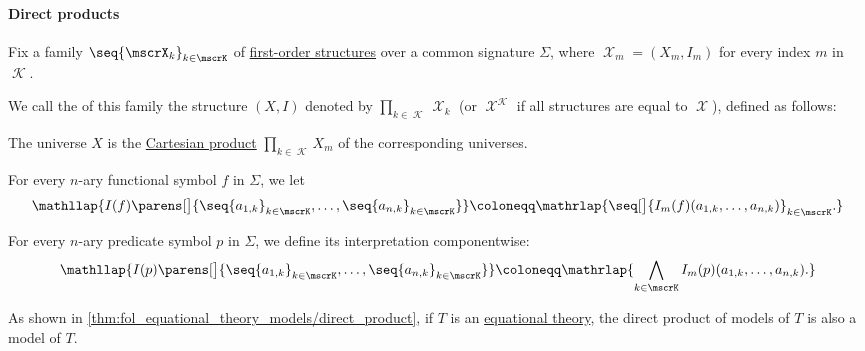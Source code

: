 \paragraph{Direct products}

\begin{definition}\label{def:fol_direct_product}
  Fix a family \( \seq{ \mscrX_k }_{k \in \mscrK} \) of \hyperref[def:fol_structure]{first-order structures} over a common signature \( \Sigma \), where \( \mscrX_m = (X_m, I_m) \) for every index \( m \) in \( \mscrK \).

  We call the  of this family the structure \( (X, I) \) denoted by \( \prod_{k \in \mscrK} \mscrX_k \) (or \( \mscrX^\mscrK \) if all structures are equal to \( \mscrX \)), defined as follows:
  \begin{thmenum}
     The universe \( X \) is the \hyperref[def:cartesian_product]{Cartesian product} \( \prod_{k \in \mscrK} X_m \) of the corresponding universes.

     For every \( n \)-ary functional symbol \( f \) in \( \Sigma \), we let
    \begin{equation*}
      \mathllap{I(f)\parens[\big]{ \seq{ a_{1,k} }_{k \in \mscrK}, \ldots, \seq{ a_{n,k} }_{k \in \mscrK} }} \coloneqq \mathrlap{\seq[\big]{ I_m(f)(a_{1,k}, \ldots, a_{n,k}) }_{k \in \mscrK}.}
    \end{equation*}

     For every \( n \)-ary predicate symbol \( p \) in \( \Sigma \), we define its interpretation componentwise:
    \begin{equation*}
      \mathllap{I(p)\parens[\big]{ \seq{ a_{1,k} }_{k \in \mscrK}, \ldots, \seq{ a_{n,k} }_{k \in \mscrK} }} \coloneqq \mathrlap{\bigwedge_{k \in \mscrK} I_m(p)(a_{1,k}, \ldots, a_{n,k}).}
    \end{equation*}
  \end{thmenum}
\end{definition}
\begin{comments}
  \item As shown in \cref{thm:fol_equational_theory_models/direct_product}, if \( T \) is an \hyperref[def:fol_equational_theory]{equational theory}, the direct product of models of \( T \) is also a model of \( T \).
\end{comments}

